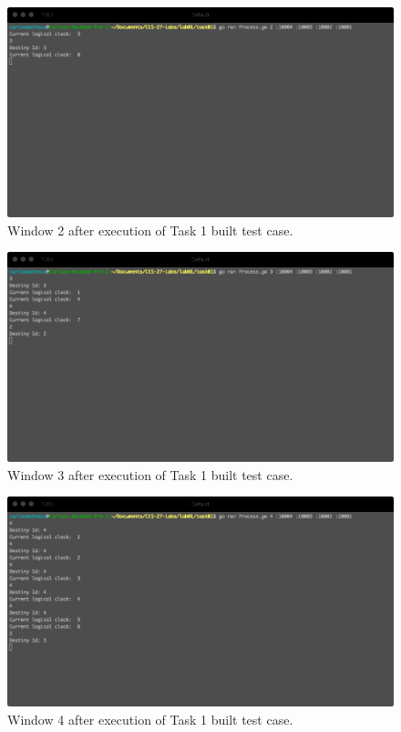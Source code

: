 \documentclass[a4paper, 11pt]{article}
\begin{document}
\begin{figure}[h]
  \begin{center}
  \includegraphics[width=4.5in]{./imgs/task1_buit_test_window2.png}
  \caption{Window 2 after execution of Task 1 built test case.}
  \label{img_task1_built_case_window2}
  \end{center}
\end{figure}

\begin{figure}[h]
  \begin{center}
  \includegraphics[width=4.5in]{./imgs/task1_buit_test_window3.png}
  \caption{Window 3 after execution of Task 1 built test case.}
  \label{img_task1_built_case_window3}
  \end{center}
\end{figure}

\begin{figure}[h]
  \begin{center}
  \includegraphics[width=4.5in]{./imgs/task1_buit_test_window4.png}
  \caption{Window 4 after execution of Task 1 built test case.}
  \label{img_task1_built_case_window4}
  \end{center}
\end{figure}
\end{document}
